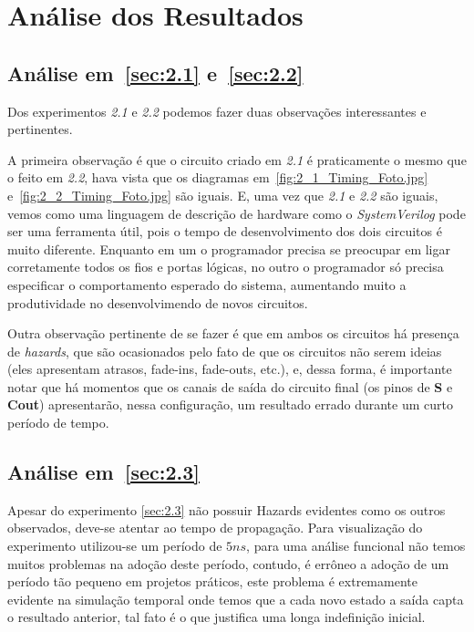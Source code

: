 \documentclass[12pt]{article}
\begin{document}
\section{Análise dos Resultados}\label{sec:resultados}

\subsection{Análise em~\ref{sec:2.1} e~\ref{sec:2.2}}\label{sec:analise2.1}

Dos experimentos \emph{2.1} e \emph{2.2} podemos fazer duas observações
interessantes e pertinentes.

A primeira observação é que o circuito criado em \emph{2.1} é praticamente o
mesmo que o feito em \emph{2.2}, hava vista que os diagramas
em~\ref{fig:2_1_Timing_Foto.jpg} e~\ref{fig:2_2_Timing_Foto.jpg} são iguais. E,
uma vez que \emph{2.1} e \emph{2.2} são iguais, vemos como uma linguagem de
descrição de hardware como o \emph{SystemVerilog} pode ser uma ferramenta útil,
pois o tempo de desenvolvimento dos dois circuitos é muito diferente. Enquanto
em um o programador precisa se preocupar em ligar corretamente todos os fios e
portas lógicas, no outro o programador só precisa especificar o comportamento
esperado do sistema, aumentando muito a produtividade no desenvolvimendo de
novos circuitos.

Outra observação pertinente de se fazer é que em ambos os circuitos há presença
de \emph{hazards}, que são ocasionados pelo fato de que os circuitos não serem
ideias (eles apresentam atrasos, fade-ins, fade-outs, etc.), e, dessa forma, é
importante notar que há momentos que os canais de saída do circuito final (os
pinos de \textbf{S} e \textbf{Cout}) apresentarão, nessa configuração, um
resultado errado durante um curto período de tempo.


\subsection{Análise em~\ref{sec:2.3}}\label{sec:analise2.4}

Apesar do experimento \ref{sec:2.3} não possuir Hazards evidentes como os outros observados, deve-se atentar ao tempo de propagação. Para visualização do experimento utilizou-se um período de $5ns$, para uma análise funcional não temos muitos problemas na adoção deste período, contudo, é errôneo a adoção de um período tão pequeno em projetos práticos, este problema é extremamente evidente na simulação temporal onde temos que a cada novo estado a saída capta o resultado anterior, tal fato é o que justifica uma longa indefinição inicial.
\end{document}
